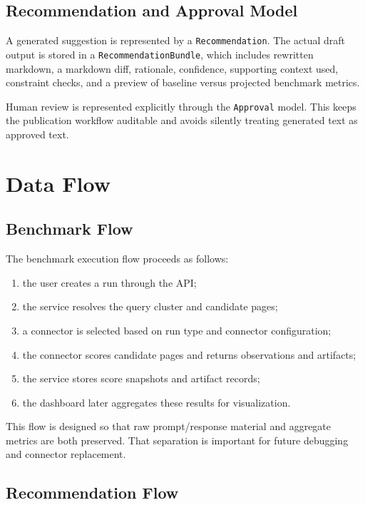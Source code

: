 \subsection{Recommendation and Approval Model}

A generated suggestion is represented by a \texttt{Recommendation}. The actual draft output is
stored in a \texttt{RecommendationBundle}, which includes rewritten markdown, a markdown
diff, rationale, confidence, supporting context used, constraint checks, and a preview of
baseline versus projected benchmark metrics.

Human review is represented explicitly through the \texttt{Approval} model. This keeps the
publication workflow auditable and avoids silently treating generated text as approved text.

\section{Data Flow}

\subsection{Benchmark Flow}

The benchmark execution flow proceeds as follows:
\begin{enumerate}
    \item the user creates a run through the API;
    \item the service resolves the query cluster and candidate pages;
    \item a connector is selected based on run type and connector configuration;
    \item the connector scores candidate pages and returns observations and artifacts;
    \item the service stores score snapshots and artifact records;
    \item the dashboard later aggregates these results for visualization.
\end{enumerate}

This flow is designed so that raw prompt/response material and aggregate metrics are both
preserved. That separation is important for future debugging and connector replacement.

\subsection{Recommendation Flow}

